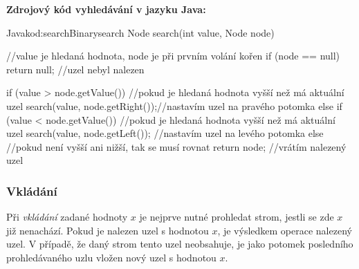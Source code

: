 \documentclass[
  biblatex=false,
  font=serif,
  glossaries=false,
  tables=false,
  theorems=false,
  index
]{kidiplom}
\begin{document}
\medskip \medskip \medskip
\noindent \textbf{Zdrojový kód vyhledávání v jazyku Java:}

\begin{kicode}{Java}{kod:searchBinary}{search}
Node search(int value, Node node) { //value je hledaná hodnota, node je při prvním volání kořen
	if (node == null) {
		return null; //uzel nebyl nalezen
	}
	
	if (value > node.getValue()) {//pokud je hledaná hodnota vyšší než má aktuální uzel
		search(value, node.getRight());//nastavím uzel na pravého potomka
	} else if (value < node.getValue()) { //pokud je hledaná hodnota vyšší než má aktuální uzel
		search(value, node.getLeft()); //nastavím uzel na levého potomka
	} else { //pokud není vyšší ani nižší, tak se musí rovnat
		return node; //vrátím nalezený uzel
	}
}
\end{kicode}


\newpage
\subsubsection{Vkládání}
\indent\indent Při \textit{vkládání} zadané hodnoty $x$ je nejprve nutné prohledat strom, jestli se zde $x$ již nenachází. Pokud je nalezen uzel s hodnotou $x$, je výsledkem operace nalezený uzel. V případě, že daný strom tento uzel neobsahuje, je jako potomek posledního prohledávaného uzlu vložen nový uzel s hodnotou $x$. \\
\end{document}
